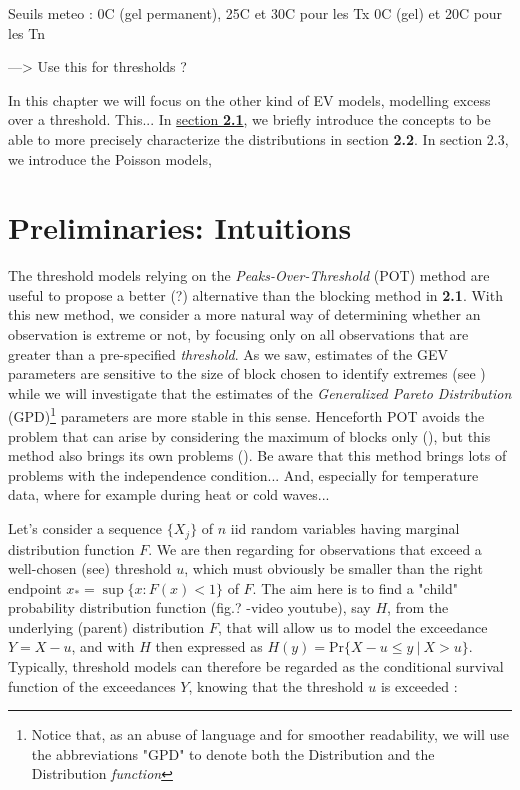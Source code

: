 \documentclass[11pt,a4paper,openany ]{book}
\begin{document}
Seuils meteo : 0C (gel permanent), 25C et 30C pour les Tx
0C (gel) et 20C pour les Tn

---> Use this for thresholds ?

In this chapter we will focus on the other kind of EV models, modelling excess over a 
threshold. This...
In \hyperref[sec::2.1]{section \textbf{2.1}}, we briefly introduce the concepts to be able 
to more precisely characterize
 the distributions in section \textbf{2.2}. In section 2.3, we introduce the Poisson 
 models, 
 
 \newpage
\section{Preliminaries: Intuitions}\label{sec::2.1}

The threshold models relying on the \emph{Peaks-Over-Threshold} (POT) method are useful to propose a better (?) alternative than the blocking method in \textbf{2.1}. With this new method, we consider a more natural way of determining whether an observation is extreme or not, by focusing only on all observations that are greater than a pre-specified \emph{threshold}. As we saw, estimates of the GEV parameters are sensitive to the size of block chosen to identify extremes (see ) while we will investigate that the estimates of the \emph{Generalized Pareto Distribution} (GPD)\footnote{Notice that, as an abuse of language and for smoother readability, we will use the abbreviations "GPD" to denote both the Distribution and the Distribution \emph{function} } parameters are more stable in this sense. Henceforth POT avoids the problem that can arise by considering the maximum of blocks only (), but this method also brings its own problems (). Be aware that this method brings lots of problems with the independence condition... And, especially for temperature data, where for example during heat or cold waves...
\newline

Let's consider a sequence $\{X_j\}$ of $n$ iid random variables having marginal distribution function $F$. We are then regarding for observations that exceed a well-chosen (see) threshold $u$, which must obviously be smaller than the right endpoint $x_*=\sup\{x:F(x)<1\}$ of $F$. The aim here is to find a "child" probability distribution function (fig.? -video youtube), say $H$, from the underlying (parent) distribution $F$, that will allow us to model the exceedance $Y=X-u$, and  with $H$ then expressed as $\boxed{H(y)=\text{Pr}\{X-u\leq y \ | \ X>u\}}$. Typically, threshold models can therefore be regarded as the conditional survival function of the exceedances $Y$, knowing that the threshold $u$ is exceeded \cite[pp.147]{beirlant_statistics_2006} :
\end{document}
